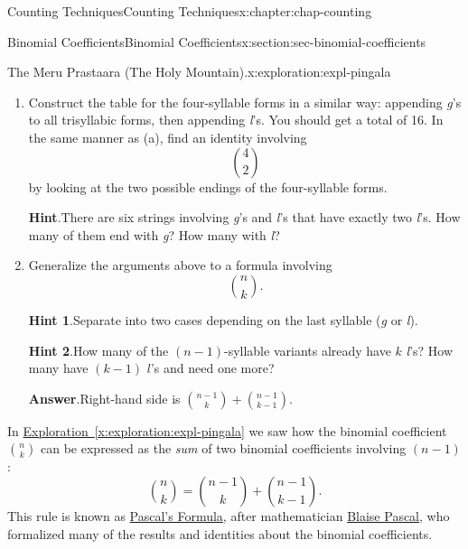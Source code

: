 \documentclass[oneside,10pt,]{book}
\newcommand{\blocktitlefont}{\relax}
\newcommand{\xreffont}{\relax}
\numberwithin{equation}{section}
\begin{document}
\begin{chapterptx}{Counting Techniques}{}{Counting Techniques}{}{}{x:chapter:chap-counting}
\begin{sectionptx}{Binomial Coefficients}{}{Binomial Coefficients}{}{}{x:section:sec-binomial-coefficients}
\begin{exploration}{The Meru Prastaara (The Holy Mountain).}{x:exploration:expl-pingala}
\begin{enumerate}[font=\bfseries,label=(\alph*),ref=\alph*]
\begin{equation*}
\binom{3}{2} = \binom{2}{2} + \binom{2}{1}\text{.}
\end{equation*}
%
\item{}Construct the table for the four-syllable forms in a similar way: appending \emph{g}'s to all trisyllabic forms, then appending \emph{l}'s. You should get a total of 16. In the same manner as (a), find an identity involving%
\begin{equation*}
\displaystyle\binom{4}{2}
\end{equation*}
by looking at the two possible endings of the four-syllable forms.%
\par\smallskip%
\noindent\textbf{\blocktitlefont Hint}.\hypertarget{g:hint:id446553}{}\quad{}There are six strings involving \emph{g}'s and \emph{l}'s that have exactly two \emph{l}'s. How many of them end with \emph{g}? How many with \emph{l}?%
\item{}Generalize the arguments above to a formula involving%
\begin{equation*}
\binom{n}{k}\text{.}
\end{equation*}
%
\par\smallskip%
\noindent\textbf{\blocktitlefont Hint 1}.\hypertarget{g:hint:id446757}{}\quad{}Separate into two cases depending on the last syllable (\emph{g} or \emph{l}).%
\par\smallskip%
\noindent\textbf{\blocktitlefont Hint 2}.\hypertarget{g:hint:id446769}{}\quad{}How many of the \((n-1)\)-syllable variants already have \(k\) \emph{l}'s? How many have \((k-1)\) \(l\)'s and need one more?%
\par\smallskip%
\noindent\textbf{\blocktitlefont Answer}.\hypertarget{g:answer:id446912}{}\quad{}Right-hand side is \(\displaystyle\binom{n-1}{k} + \binom{n-1}{k-1}\).%
\end{enumerate}
\end{exploration}
In \hyperref[x:exploration:expl-pingala]{Exploration~{\xreffont\ref{x:exploration:expl-pingala}}} we saw how the binomial coefficient \(\displaystyle\binom{n}{k}\) can be expressed as the \emph{sum} of two binomial coefficients involving \((n-1)\):%
\begin{equation*}
\binom{n}{k} = \binom{n-1}{k} + \binom{n-1}{k-1}\text{.}
\end{equation*}
This rule is known as \href{https://en.wikipedia.org/wiki/Pascal\%27s_rule}{Pascal's Formula}, after mathematician \href{https://en.wikipedia.org/wiki/Blaise_Pascal}{Blaise Pascal}, who formalized many of the results and identities about the binomial coefficients.%

\end{sectionptx}
\end{chapterptx}
\end{document}
